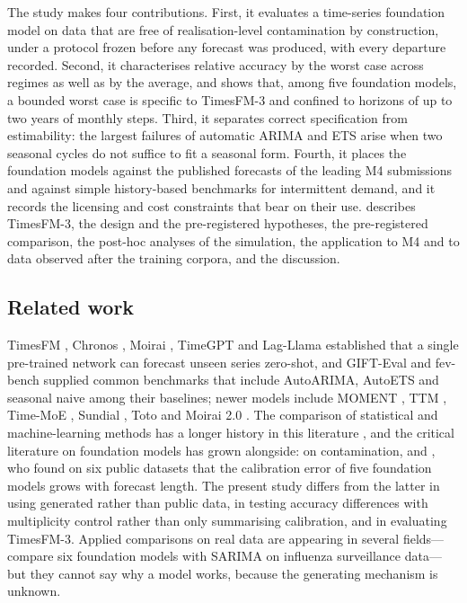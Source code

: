 The study makes four contributions. First, it evaluates a time-series foundation model on data that are
free of realisation-level contamination by construction, under a protocol frozen before any forecast was
produced, with every departure recorded. Second, it characterises relative accuracy by the worst case
across regimes as well as by the average, and shows that, among five foundation models, a bounded worst
case is specific to TimesFM-3 and confined to horizons of up to two years of monthly steps. Third, it
separates correct specification from estimability: the largest failures of automatic ARIMA and ETS arise
when two seasonal cycles do not suffice to fit a seasonal form. Fourth, it places the foundation models
against the published forecasts of the leading M4 submissions and against simple history-based benchmarks
for intermittent demand, and it records the licensing and cost constraints that bear on their use.
 describes TimesFM-3,  the design and the pre-registered
hypotheses,  the pre-registered comparison,  the post-hoc
analyses of the simulation,  the application to M4 and to data
observed after the training corpora, and 
the discussion.

\subsection{Related work}
\label{sec:related}

TimesFM \citep{das2024timesfm}, Chronos \citep{ansari2024chronos}, Moirai \citep{woo2024moirai},
TimeGPT \citep{garza2023timegpt} and Lag-Llama \citep{rasul2023lagllama} established that a single
pre-trained network can forecast unseen series zero-shot, and GIFT-Eval \citep{aksu2024gifteval} and
fev-bench \citep{shchur2025fevbench} supplied common benchmarks that include AutoARIMA, AutoETS and
seasonal naive among their baselines; newer models include MOMENT \citep{goswami2024moment}, TTM
\citep{ekambaram2024ttm}, Time-MoE \citep{shi2024timemoe}, Sundial \citep{liu2025sundial}, Toto
\citep{cohen2025toto} and Moirai 2.0 \citep{liu2025moirai2}. The comparison of statistical and machine-learning methods has a
longer history in this literature \citep{makridakis2018statistical}, and the critical literature on
foundation models has grown alongside: \citet{meyer2025leakage} on contamination, and
\citet{adler2026calibrated}, who found on six public datasets that the calibration error of five
foundation models grows with forecast length. The present study differs from the latter in using generated
rather than public data, in testing accuracy differences with multiplicity control rather than only
summarising calibration, and in evaluating TimesFM-3. Applied comparisons on real data are appearing in
several fields---\citet{chu2026influenza} compare six foundation models with SARIMA on influenza
surveillance data---but they cannot say why a model works, because the generating mechanism is unknown.

